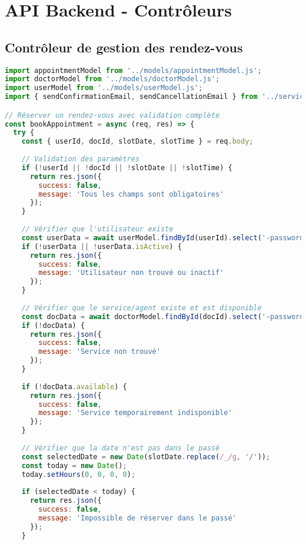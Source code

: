 \section{API Backend - Contrôleurs}

\subsection{Contrôleur de gestion des rendez-vous}

\begin{lstlisting}[language=JavaScript, caption=appointmentController.js - Gestion complète des rendez-vous]
import appointmentModel from '../models/appointmentModel.js';
import doctorModel from '../models/doctorModel.js';
import userModel from '../models/userModel.js';
import { sendConfirmationEmail, sendCancellationEmail } from '../services/emailService.js';

// Réserver un rendez-vous avec validation complète
const bookAppointment = async (req, res) => {
  try {
    const { userId, docId, slotDate, slotTime } = req.body;
    
    // Validation des paramètres
    if (!userId || !docId || !slotDate || !slotTime) {
      return res.json({
        success: false,
        message: 'Tous les champs sont obligatoires'
      });
    }
    
    // Vérifier que l'utilisateur existe
    const userData = await userModel.findById(userId).select('-password');
    if (!userData || !userData.isActive) {
      return res.json({
        success: false,
        message: 'Utilisateur non trouvé ou inactif'
      });
    }
    
    // Vérifier que le service/agent existe et est disponible
    const docData = await doctorModel.findById(docId).select('-password');
    if (!docData) {
      return res.json({
        success: false,
        message: 'Service non trouvé'
      });
    }
    
    if (!docData.available) {
      return res.json({
        success: false,
        message: 'Service temporairement indisponible'
      });
    }
    
    // Vérifier que la date n'est pas dans le passé
    const selectedDate = new Date(slotDate.replace(/_/g, '/'));
    const today = new Date();
    today.setHours(0, 0, 0, 0);
    
    if (selectedDate < today) {
      return res.json({
        success: false,
        message: 'Impossible de réserver dans le passé'
      });
    }
    

\end{lstlisting}
